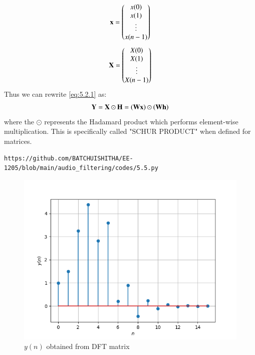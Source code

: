 \documentclass[journal,12pt,twocolumn]{IEEEtran}
\theoremstyle{remark}
\begin{document}
\begin{enumerate}[label=\thesection.\arabic*]
\begin{align}
	\mathbf{x} = 
	\begin{pmatrix}
		x(0) \\ x(1) \\ \vdots \\ x(n - 1)
	\end{pmatrix}
\end{align}
\begin{align}
	\mathbf{X} = 
	\begin{pmatrix}
		X(0) \\ X(1) \\ \vdots \\ X(n - 1)
	\end{pmatrix}
\end{align}
Thus we can rewrite  \eqref{eq:5.2.1} as:
\begin{align}
	\mathbf{Y} = \mathbf{X}\odot\mathbf{H} = \left(\mathbf{W}\mathbf{x}\right)\odot\left(\mathbf{W}\mathbf{h}\right)
\end{align}
where the $\odot$ represents the Hadamard product which performs element-wise multiplication.
This is specifically called "SCHUR PRODUCT" when defined for matrices.
\begin{lstlisting}
https://github.com/BATCHUISHITHA/EE-1205/blob/main/audio_filtering/codes/5.5.py
\end{lstlisting}
\begin{figure}[ht]
	\centering
	\includegraphics[width=\columnwidth]{figs/5.5.png}
	\caption{$y(n)$ obtained from DFT matrix }
	\label{fig:5.5}
\end{figure}
\end{enumerate}
\end{document}
